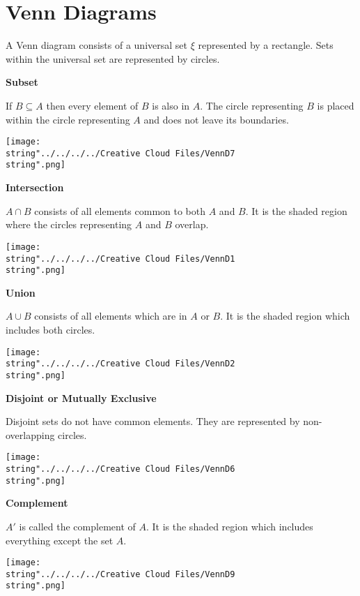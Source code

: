 \documentclass[11pt,a4paper]{book}
\begin{document}
\newpage
\section{Venn Diagrams}

A Venn diagram consists of a universal set $\xi$ represented by a
rectangle. Sets within the universal set are represented by circles.

\textbf{\large{}Subset}{\large\par}

If $B\subseteq A$ then every element of $B$ is also in $A$. The
circle representing $B$ is placed within the circle representing
$A$ and does not leave its boundaries.
\begin{center}
\texttt{[image: \\string"../../../../Creative Cloud Files/VennD7\\string".png]}
\par\end{center}

\textbf{\large{}Intersection}{\large\par}

$A\cap B$ consists of all elements common to both $A$ and $B$.
It is the shaded region where the circles representing $A$ and $B$
overlap.
\begin{center}
\texttt{[image: \\string"../../../../Creative Cloud Files/VennD1\\string".png]}
\par\end{center}

\textbf{\large{}Union}{\large\par}

$A\cup B$ consists of all elements which are in $A$ or $B$. It
is the shaded region which includes both circles.
\begin{center}
\texttt{[image: \\string"../../../../Creative Cloud Files/VennD2\\string".png]}
\par\end{center}

\textbf{\large{}Disjoint or Mutually Exclusive}{\large\par}

Disjoint sets do not have common elements. They are represented by
non-overlapping circles.
\begin{center}
\texttt{[image: \\string"../../../../Creative Cloud Files/VennD6\\string".png]}
\par\end{center}

\textbf{\large{}Complement}{\large\par}
$A'$ is called the complement of $A$. It is the shaded region which includes everything except the set $A$.
\begin{center}
\texttt{[image: \\string"../../../../Creative Cloud Files/VennD9\\string".png]}
\par\end{center}
\end{document}
